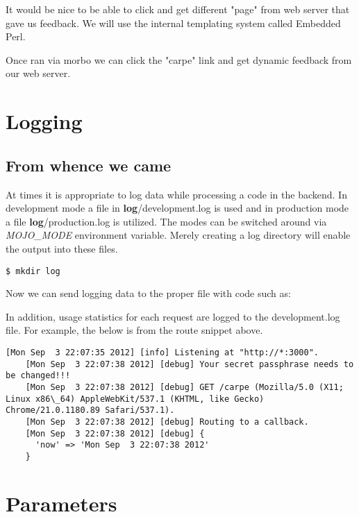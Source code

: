 \documentclass[16pt,pdftex]{book}
\begin{document}
It would be nice to be able to click and get different "page" from web server
that gave us feedback. We will use the internal templating system called
Embedded Perl.



Once ran via morbo we can click the "carpe" link and get dynamic feedback from our web server.

\section{Logging}

\subsection{From whence we came}

At times it is appropriate to log data while processing a code in the backend.
In development mode a file in \textbf{log}/development.log is used and in production
mode a file \textbf{log}/production.log is utilized. The modes can be switched around
via \textit{MOJO\_MODE} environment variable. Merely creating a log directory will enable
the output into these files.

\begin{lstlisting}[style=BashInputStyle]
$ mkdir log
\end{lstlisting}

Now we can send logging data to the proper file with code such as:



In addition, usage statistics for each request are logged to the
development.log file.  For example, the below is from the route snippet above.

\begin{lstlisting}[style=BashOutputStyle]
    [Mon Sep  3 22:07:35 2012] [info] Listening at "http://*:3000".
    [Mon Sep  3 22:07:38 2012] [debug] Your secret passphrase needs to be changed!!!
    [Mon Sep  3 22:07:38 2012] [debug] GET /carpe (Mozilla/5.0 (X11; Linux x86\_64) AppleWebKit/537.1 (KHTML, like Gecko) Chrome/21.0.1180.89 Safari/537.1).
    [Mon Sep  3 22:07:38 2012] [debug] Routing to a callback.
    [Mon Sep  3 22:07:38 2012] [debug] {
      'now' => 'Mon Sep  3 22:07:38 2012'
    }
\end{lstlisting}

\section{Parameters}
\end{document}
